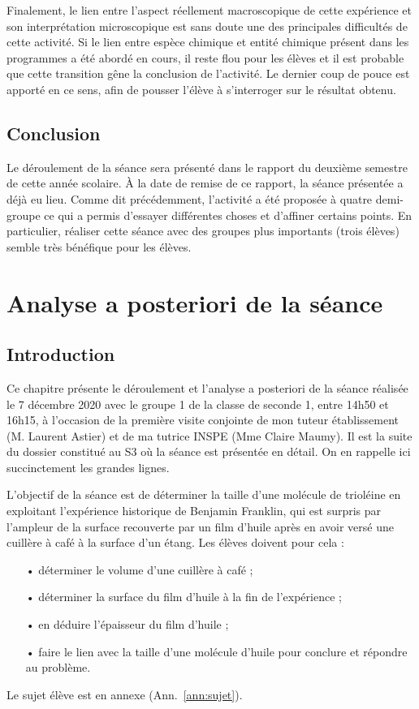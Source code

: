 \documentclass[12pt,a4paper, fleqn]{report}
\begin{document}
Finalement, le lien entre l'aspect réellement macroscopique de cette expérience et son interprétation microscopique est sans doute une des principales difficultés de cette activité.
Si le lien entre espèce chimique et entité chimique présent dans les programmes a été abordé en cours, il reste flou pour les élèves et il est probable que cette transition gêne la conclusion de l'activité.
Le dernier coup de pouce est apporté en ce sens, afin de pousser l'élève à s'interroger sur le résultat obtenu.

\section*{Conclusion}

Le déroulement de la séance sera présenté dans le rapport du deuxième semestre de cette année scolaire.
À la date de remise de ce rapport, la séance présentée a déjà eu lieu.
Comme dit précédemment, l'activité a été proposée à quatre demi-groupe ce qui a permis d'essayer différentes choses et d'affiner certains points.
En particulier, réaliser cette séance avec des groupes plus importants (trois élèves) semble très bénéfique pour les élèves.


\chapter{Analyse a posteriori de la séance}

\section*{Introduction}

Ce chapitre présente le déroulement et l'analyse a posteriori de la séance réalisée le 7 décembre 2020 avec le groupe 1 de la classe de seconde 1, entre 14h50 et 16h15, à l'occasion de la première visite conjointe de mon tuteur établissement (M. Laurent Astier) et de ma tutrice INSPE (Mme Claire Maumy).
Il est la suite du dossier constitué au S3 où la séance est présentée en détail.
On en rappelle ici succinctement les grandes lignes.

L'objectif de la séance est de déterminer la taille d'une molécule de trioléine en exploitant l'expérience historique de Benjamin Franklin, qui est surpris par l'ampleur de la surface recouverte par un film d'huile après en avoir versé une cuillère à café à la surface d'un étang.
Les élèves doivent pour cela :
\begin{itemize}
\item[•] déterminer le volume d'une cuillère à café ;
\item[•] déterminer la surface du film d'huile à la fin de l'expérience ;
\item[•] en déduire l'épaisseur du film d'huile ;
\item[•] faire le lien avec la taille d'une molécule d'huile pour conclure et répondre au problème.
\end{itemize}
Le sujet élève est en annexe (Ann.~\ref{ann:sujet}).
\end{document}
